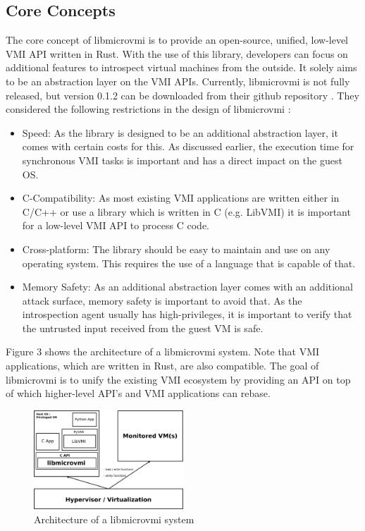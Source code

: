 \documentclass[sigconf]{acmart}
\begin{document}
\subsection{Core Concepts}
The core concept of libmicrovmi is to provide an open-source, unified, low-level VMI API written in Rust. With the use of this library, developers can focus on additional features to introspect virtual machines from the outside. It solely aims to be an abstraction layer on the VMI APIs. Currently, libmicrovmi is not fully released, but version 0.1.2 can be downloaded from their github repository \cite{githublibmicrovmi}.
\newline
\newline
They considered the following restrictions in the design of libmicrovmi \cite{fosdemlibmicrovmi}:
\newline
\begin{itemize}
	\item Speed: As the library is designed to be an additional abstraction layer, it comes with certain costs for this. As discussed earlier, the execution time for synchronous VMI tasks is important and has a direct impact on the guest OS.  
	\newline 
	\item C-Compatibility: As most existing VMI applications are written either in C/C++ or use a library which is written in C (e.g. LibVMI) it is important for a low-level VMI API to process C code. 
	\newline
	\item Cross-platform: The library should be easy to maintain and use on any operating system. This requires the use of a language that is capable of that.
	\newline
	\item Memory Safety: As an additional abstraction layer comes with an additional attack surface, memory safety is important to avoid that. As the introspection agent usually has high-privileges, it is important to verify that the untrusted input received from the guest VM is safe. 
	\newline
\end{itemize}
Figure 3 shows the architecture of a libmicrovmi system. Note that VMI applications, which are written in Rust, are also compatible. The goal of libmicrovmi is to unify the existing VMI ecosystem by providing an API on top of which higher-level API's and VMI applications can rebase.
\newline
\begin{figure}[h]
\centering
\includegraphics[width=0.5\textwidth]{libmicrovmi}
\caption{Architecture of a libmicrovmi system}
\end{figure}
\end{document}

